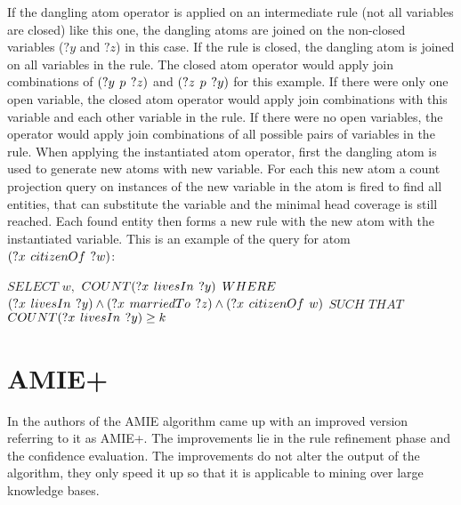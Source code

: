 If the dangling atom operator is applied on an intermediate rule (not all variables are closed) like this one, the dangling atoms are joined on the non-closed variables ($?y$ and $?z$) in this case. If the rule is closed, the dangling atom is joined on all variables in the rule. The closed atom operator would apply join combinations of $(?y\hspace{0.4em}p\hspace{0.4em}?z)$ and $(?z\hspace{0.4em}p\hspace{0.4em}?y)$ for this example. If there were only one open variable, the closed atom operator would apply join combinations with this variable and each other variable in the rule. If there were no open variables, the operator would apply join combinations of all possible pairs of variables in the rule. When applying the instantiated atom operator, first the dangling atom is used to generate new atoms with new variable. For each this new atom a count projection query on instances of the new variable in the atom is fired to find all entities, that can substitute the variable and the minimal head coverage is still reached. Each found entity then forms a new rule with the new atom with the instantiated variable. This is an example of the query for atom $(?x\hspace{0.4em}citizenOf\hspace{0.4em}?w)$:

$SELECT$ $w,$ $COUNT(?x\hspace{0.4em}livesIn\hspace{0.4em}?y)$ $WHERE\\$
$(?x\hspace{0.4em}livesIn\hspace{0.4em}?y) \land (?x\hspace{0.4em}marriedTo\hspace{0.4em}?z) \land (?x\hspace{0.4em}citizenOf\hspace{0.4em}w)\\$
$SUCH$ $THAT$ $COUNT(?x\hspace{0.4em}livesIn\hspace{0.4em}?y)\geq k$

\section{AMIE+}

In \cite{Galarraga2015} the authors of the AMIE algorithm came up with an improved version referring to it as AMIE+. The improvements lie in the rule refinement phase and the confidence evaluation. The improvements do not alter the output of the algorithm, they only speed it up so that it is applicable to mining over large knowledge bases.

